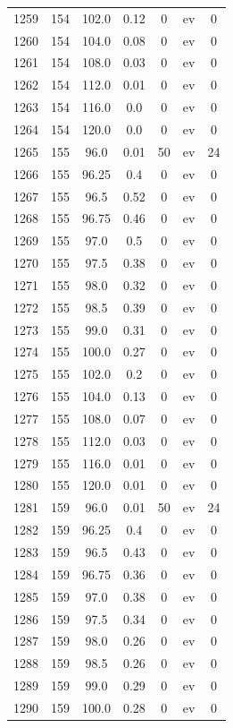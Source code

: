 \documentclass[12pt,a4paper]{article}
\begin{document}
\begin{tabular}{r|cccccc}
	1259 & 154 & 102.0 & 0.12 & 0 & ev & 0 \\
	1260 & 154 & 104.0 & 0.08 & 0 & ev & 0 \\
	1261 & 154 & 108.0 & 0.03 & 0 & ev & 0 \\
	1262 & 154 & 112.0 & 0.01 & 0 & ev & 0 \\
	1263 & 154 & 116.0 & 0.0 & 0 & ev & 0 \\
	1264 & 154 & 120.0 & 0.0 & 0 & ev & 0 \\
	1265 & 155 & 96.0 & 0.01 & 50 & ev & 24 \\
	1266 & 155 & 96.25 & 0.4 & 0 & ev & 0 \\
	1267 & 155 & 96.5 & 0.52 & 0 & ev & 0 \\
	1268 & 155 & 96.75 & 0.46 & 0 & ev & 0 \\
	1269 & 155 & 97.0 & 0.5 & 0 & ev & 0 \\
	1270 & 155 & 97.5 & 0.38 & 0 & ev & 0 \\
	1271 & 155 & 98.0 & 0.32 & 0 & ev & 0 \\
	1272 & 155 & 98.5 & 0.39 & 0 & ev & 0 \\
	1273 & 155 & 99.0 & 0.31 & 0 & ev & 0 \\
	1274 & 155 & 100.0 & 0.27 & 0 & ev & 0 \\
	1275 & 155 & 102.0 & 0.2 & 0 & ev & 0 \\
	1276 & 155 & 104.0 & 0.13 & 0 & ev & 0 \\
	1277 & 155 & 108.0 & 0.07 & 0 & ev & 0 \\
	1278 & 155 & 112.0 & 0.03 & 0 & ev & 0 \\
	1279 & 155 & 116.0 & 0.01 & 0 & ev & 0 \\
	1280 & 155 & 120.0 & 0.01 & 0 & ev & 0 \\
	1281 & 159 & 96.0 & 0.01 & 50 & ev & 24 \\
	1282 & 159 & 96.25 & 0.4 & 0 & ev & 0 \\
	1283 & 159 & 96.5 & 0.43 & 0 & ev & 0 \\
	1284 & 159 & 96.75 & 0.36 & 0 & ev & 0 \\
	1285 & 159 & 97.0 & 0.38 & 0 & ev & 0 \\
	1286 & 159 & 97.5 & 0.34 & 0 & ev & 0 \\
	1287 & 159 & 98.0 & 0.26 & 0 & ev & 0 \\
	1288 & 159 & 98.5 & 0.26 & 0 & ev & 0 \\
	1289 & 159 & 99.0 & 0.29 & 0 & ev & 0 \\
	1290 & 159 & 100.0 & 0.28 & 0 & ev & 0 \\

\end{tabular}
\end{document}
